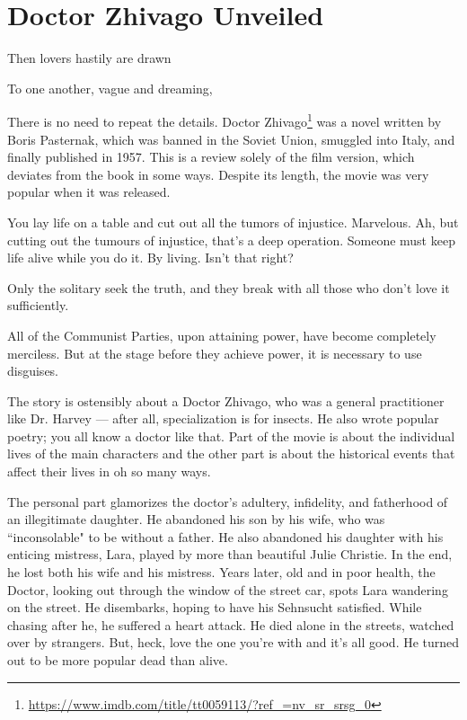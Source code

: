 \section{Doctor Zhivago Unveiled}

\begin{quotex}
Then lovers hastily are drawn

To one another, vague and dreaming, 

\end{quotex}
There is no need to repeat the details. Doctor Zhivago\footnote{\url{https://www.imdb.com/title/tt0059113/?ref_=nv_sr_srsg_0}} was a novel written by Boris Pasternak, which was banned in the Soviet Union, smuggled into Italy, and finally published in 1957. This is a review solely of the film version, which deviates from the book in some ways. Despite its length, the movie was very popular when it was released.

\begin{quotex}
You lay life on a table and cut out all the tumors of injustice. Marvelous. Ah, but cutting out the tumours of injustice, that's a deep operation. Someone must keep life alive while you do it. By living. Isn't that right?

Only the solitary seek the truth, and they break with all those who don't love it sufficiently.

All of the Communist Parties, upon attaining power, have become completely merciless. But at the stage before they achieve power, it is necessary to use disguises.


\end{quotex}
The story is ostensibly about a Doctor Zhivago, who was a general practitioner like Dr. Harvey — after all, specialization is for insects. He also wrote popular poetry; you all know a doctor like that. Part of the movie is about the individual lives of the main characters and the other part is about the historical events that affect their lives in oh so many ways. 

The personal part glamorizes the doctor's adultery, infidelity, and fatherhood of an illegitimate daughter. He abandoned his son by his wife, who was ``inconsolable" to be without a father. He also abandoned his daughter with his enticing mistress, Lara, played by more than beautiful Julie Christie. In the end, he lost both his wife and his mistress. Years later, old and in poor health, the Doctor, looking out through the window of the street car, spots Lara wandering on the street. He disembarks, hoping to have his Sehnsucht satisfied. While chasing after he, he suffered a heart attack. He died alone in the streets, watched over by strangers. But, heck, love the one you're with and it's all good. He turned out to be more popular dead than alive.

